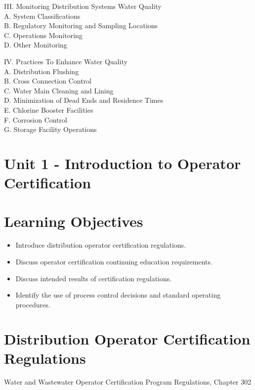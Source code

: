 \documentclass[10pt]{article}
\begin{document}
III. Monitoring Distribution Systems Water Quality\\
A. System Classifications\\
B. Regulatory Monitoring and Sampling Locations\\
C. Operations Monitoring\\
D. Other Monitoring

IV. Practices To Enhance Water Quality\\
A. Distribution Flushing\\
B. Cross Connection Control\\
C. Water Main Cleaning and Lining\\
D. Minimization of Dead Ends and Residence Times\\
E. Chlorine Booster Facilities\\
F. Corrosion Control\\
G. Storage Facility Operations

\section{Unit 1 - Introduction to Operator Certification}
\section{Learning Objectives}
\begin{itemize}
  \item Introduce distribution operator certification regulations.

  \item Discuss operator certification continuing education requirements.

  \item Discuss intended results of certification regulations.

  \item Identify the use of process control decisions and standard operating procedures.

\end{itemize}
\section{Distribution Operator Certification Regulations}
Water and Wastewater Operator Certification Program Regulations, Chapter 302
\end{document}
